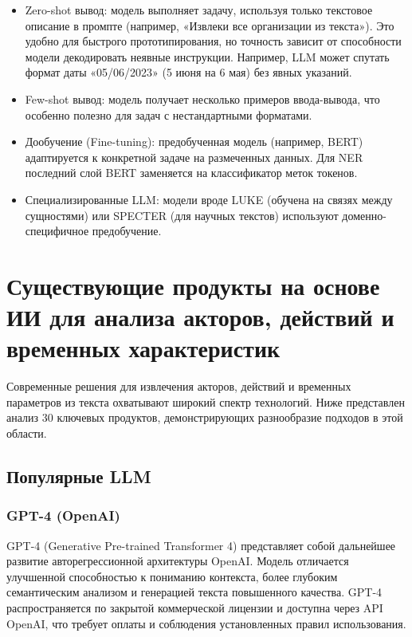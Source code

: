 \begin{itemize}
    \item Zero-shot вывод: модель выполняет задачу, используя только текстовое описание в промпте (например, «Извлеки все организации из текста»). Это удобно для быстрого прототипирования, но точность зависит от способности модели декодировать неявные инструкции. Например, LLM может спутать формат даты «05/06/2023» (5 июня на 6 мая) без явных указаний.

    \item Few-shot вывод: модель получает несколько примеров ввода-вывода, что особенно полезно для задач с нестандартными форматами.
    
    \item Дообучение (Fine-tuning): предобученная модель (например, BERT) адаптируется к конкретной задаче на размеченных данных. Для NER последний слой BERT заменяется на классификатор меток токенов.

    \item Специализированные LLM: модели вроде LUKE (обучена на связях между сущностями) или SPECTER (для научных текстов) используют доменно-специфичное предобучение.
\end{itemize}

\section{Существующие продукты на основе ИИ для анализа акторов, действий и временных характеристик}

Современные решения для извлечения акторов, действий и временных параметров из текста охватывают широкий спектр технологий. Ниже представлен анализ 30 ключевых продуктов, демонстрирующих разнообразие подходов в этой области.

\subsection{Популярные LLM}

\subsubsection{GPT-4 (OpenAI)}

GPT-4 (Generative Pre-trained Transformer 4) \cite{lib:chatgpt} представляет собой дальнейшее развитие авторегрессионной архитектуры OpenAI. 
Модель отличается улучшенной способностью к пониманию контекста, более глубоким семантическим анализом и генерацией текста повышенного качества. 
GPT-4 распространяется по закрытой коммерческой лицензии и доступна через API OpenAI, что требует оплаты и соблюдения установленных правил использования.

